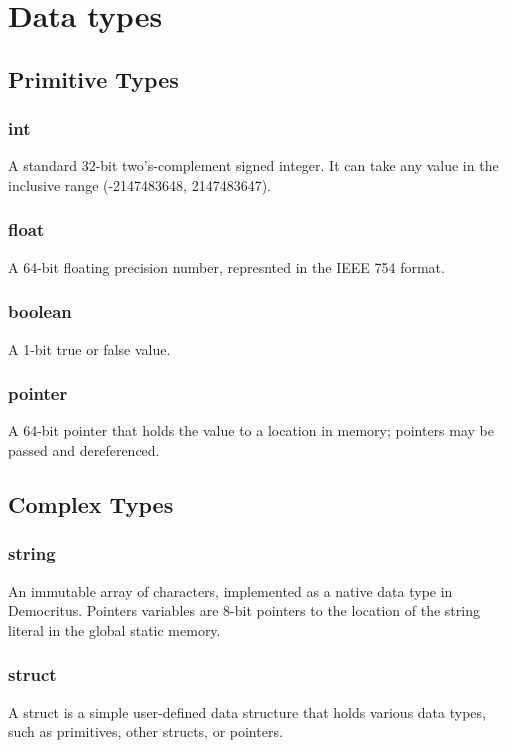 \section{Data types}
    \subsection{Primitive Types}
        \subsubsection{int}
            A standard 32-bit two's-complement signed integer. It can take any value in the inclusive range (-2147483648, 2147483647).
        \subsubsection{float}
            A 64-bit floating precision number, represnted in the IEEE 754 format.            
        \iffalse\subsubsection{char}
            An 8-bit ASCII character. We include the extended ASCII set, so we use all 256 possible values.\fi
        \subsubsection{boolean}
            A 1-bit true or false value.
        \subsubsection{pointer}
            A 64-bit pointer that holds the value to a location in memory; pointers may be passed and dereferenced.
    \subsection{Complex Types}
         \iffalse\subsubsection{Array}
            A fixed-size array, allocated on the stack and containing other primitive types. The size must be defined at declaration. An array object can be accessed by standard bracket notation, i.e. \texttt{list1[0]}.\fi
        \subsubsection{string}
            An immutable array of characters, implemented as a native data type in Democritus. Pointers variables are 8-bit pointers to the location of the string literal in the global static memory. 
       \subsubsection{struct}
            A struct is a simple user-defined data structure that holds various data types, such as primitives, other structs, or pointers. 

